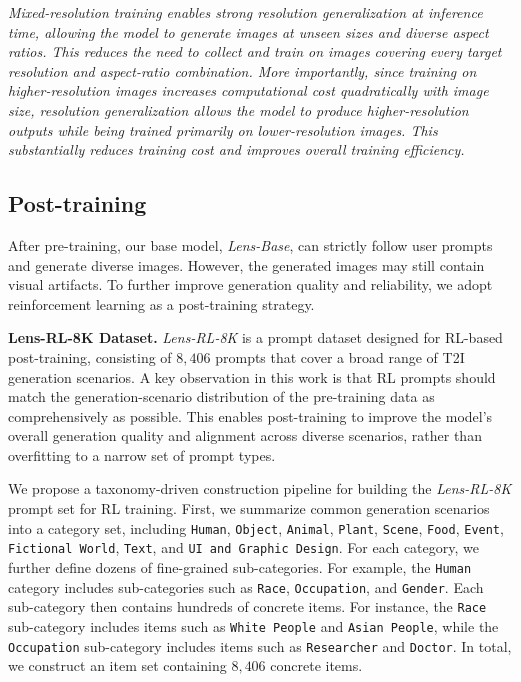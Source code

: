 \begin{tcolorbox}[colback=gray!5,colframe=black]
\textit{Mixed-resolution training enables strong resolution generalization at inference time, allowing the model to generate images at unseen sizes and diverse aspect ratios. This reduces the need to collect and train on images covering every target resolution and aspect-ratio combination. More importantly, since training on higher-resolution images increases computational cost quadratically with image size, resolution generalization allows the model to produce higher-resolution outputs while being trained primarily on lower-resolution images. This substantially reduces training cost and improves overall training efficiency.}
\end{tcolorbox}



\subsection{Post-training}
\label{sec:post-training}

After pre-training, our base model, \textit{Lens-Base}, can strictly follow user prompts and generate diverse images. However, the generated images may still contain visual artifacts. To further improve generation quality and reliability, we adopt reinforcement learning as a post-training strategy. 



\noindent\textbf{Lens-RL-8K Dataset.} \textit{Lens-RL-8K} is a prompt dataset designed for RL-based post-training, consisting of $8{,}406$ prompts that cover a broad range of T2I generation scenarios. A key observation in this work is that RL prompts should match the generation-scenario distribution of the pre-training data as comprehensively as possible. This enables post-training to improve the model’s overall generation quality and alignment across diverse scenarios, rather than overfitting to a narrow set of prompt types. 


We propose a taxonomy-driven construction pipeline for building the \textit{Lens-RL-8K} prompt set for RL training. First, we summarize common generation scenarios into a category set, including \texttt{Human}, \texttt{Object}, \texttt{Animal}, \texttt{Plant}, \texttt{Scene}, \texttt{Food}, \texttt{Event}, \texttt{Fictional World}, \texttt{Text}, and \texttt{UI and Graphic Design}. For each category, we further define dozens of fine-grained sub-categories. For example, the \texttt{Human} category includes sub-categories such as \texttt{Race}, \texttt{Occupation}, and \texttt{Gender}. Each sub-category then contains hundreds of concrete items. For instance, the \texttt{Race} sub-category includes items such as \texttt{White People} and \texttt{Asian People}, while the \texttt{Occupation} sub-category includes items such as \texttt{Researcher} and \texttt{Doctor}. In total, we construct an item set containing $8,406$ concrete items.


